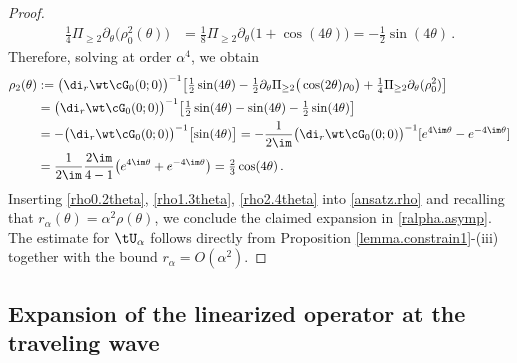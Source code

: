 \documentclass[a4paper,reqno,10pt]{article}
\newcommand{\pa}{\partial}
\begin{document}
\begin{proof}
\begin{align}
       \tfrac14	\Pi_{\geq 2}\pa_{\theta}\big( \rho_{0}^2(\theta) \big) & =  \tfrac18  \Pi_{\geq 2}\pa_{\theta}\big(  1+\cos(4\theta)  \big)= - \tfrac12 \sin(4\theta)\,.
    \end{align}
    Therefore, solving at order $\alpha^4$, we obtain 
 	\begin{align}
	\rho_{2}(\theta)  &:=   \big( \di_{r}\wt\cG_{0}(0;0) \big)^{-1} \big[ \tfrac12 \sin(4\theta)- { \tfrac12 \pa_{\theta}\Pi_{\geq 2}\big(\cos(2\theta)\rho_{0}\big) }  + \tfrac14 \Pi_{\geq 2} \pa_{\theta} (\rho_{0}^2)   \big]  \\
	&=   \big( \di_{r}\wt\cG_{0}(0;0) \big)^{-1} \big[ \tfrac12 \sin(4\theta)-{\sin(4\theta)}  -\tfrac12 \sin(4\theta) \big]  \\
    & =  -\big( \di_{r}\wt\cG_{0}(0;0) \big)^{-1} \big[ {\sin(4\theta)}  \big]  = - \frac{1}{2\im}  \big( \di_{r}\wt\cG_{0}(0;0) \big)^{-1}[e^{4\im\theta}-e^{-4\im\theta}] \nonumber \\
    		& = \frac{1}{2\im} \frac{2\im}{4-1} \big( e^{4\im\theta} + e^{-4\im\theta} \big) = \tfrac23 \cos(4\theta)  \,.   \label{rho2.4theta} 
\end{align}
 Inserting \eqref{rho0.2theta}, \eqref{rho1.3theta}, \eqref{rho2.4theta} into \eqref{ansatz.rho} and recalling that $r_\alpha(\theta)=\alpha^2 \rho(\theta)$, we conclude the claimed expansion in \eqref{ralpha.asymp}. The estimate for $\tU_\alpha$ follows directly from {Proposition \ref{lemma.constrain1}-(iii)} together with the bound $r_\alpha = O(\alpha^2)$. 
\end{proof}


\subsection{Expansion of the linearized operator at the traveling wave}
\end{document}
